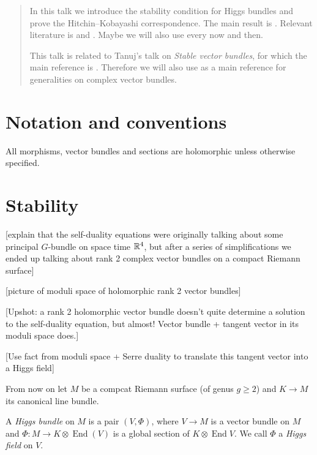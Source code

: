 \documentclass[A4paper, 12pt, british, reqno]{amsart}
\DeclareMathOperator{\End}{End}
\newcommand{\ot}{\otimes}
\begin{document}
\maketitle

\begin{abstract}
    In this talk we introduce the stability condition for Higgs bundles and prove the Hitchin--Kobayashi correspondence.
    The main result is \cite[Theorem 4.3]{hit87}.
    Relevant literature is \cite[\S 3 and \S 4]{hit87} and \cite[\S 2 and \S 3]{wen14}.
    Maybe we will also use \cite{wen16} every now and then.

    This talk is related to Tanuj's talk on \textit{Stable vector bundles}, for which the main reference is \cite{kob87}.
    Therefore we will also use \cite{kob87} as a main reference for generalities on complex vector bundles.
\end{abstract}

\tableofcontents

\section*{Notation and conventions}

All morphisms, vector bundles and sections are holomorphic unless otherwise specified.

\section{Stability}

[explain that the self-duality equations were originally talking about some principal $G$-bundle on space time $\mathbb{R}^{4}$, but after a series of simplifications \cite[\S 1]{hit87} we ended up talking about rank 2 complex vector bundles on a compact Riemann surface]

[picture of moduli space of holomorphic rank 2 vector bundles]

[Upshot: a rank 2 holomorphic vector bundle doesn't quite determine a solution to the self-duality equation, but almost! Vector bundle + tangent vector in its moduli space does.]

[Use fact from moduli space + Serre duality to translate this tangent vector into a Higgs field]

From now on let $M$ be a compcat Riemann surface (of genus $g\geqslant 2$) and $K\to M$ its canonical line bundle.

\begin{defn}
A \textit{Higgs bundle} on $M$ is a pair $(V,\Phi)$, where $V\to M$ is a vector bundle on $M$ and $\Phi\colon M\to K\ot \End(V)$ is a global section of $K\ot \End{V}$.
    We call $\Phi$ a \textit{Higgs field} on $V$.
\end{defn}
\end{document}
